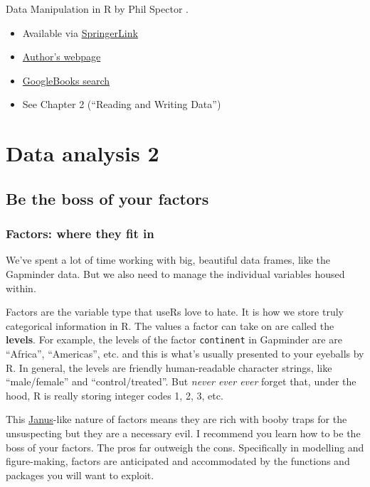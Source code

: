 \documentclass[
]{book}
\providecommand{\tightlist}{%
  \setlength{\itemsep}{0pt}\setlength{\parskip}{0pt}}
\begin{document}
Data Manipulation in R by Phil Spector \citeyearpar{spector2008}.

\begin{itemize}
\tightlist
\item
  Available via \href{https://www.springer.com/gp/book/9780387747309}{SpringerLink}
\item
  \href{https://www.stat.berkeley.edu/\%7Espector/}{Author's webpage}
\item
  \href{https://books.google.com/books?id=grfuq1twFe4C\&lpg=PP1\&dq=data\%2520manipulation\%2520spector\&pg=PP1\#v=onepage\&q\&f=false}{GoogleBooks search}
\item
  See Chapter 2 (``Reading and Writing Data'')
\end{itemize}

\hypertarget{part-data-analysis-2}{%
\part{Data analysis 2}\label{part-data-analysis-2}}

\hypertarget{factors-boss}{%
\chapter{Be the boss of your factors}\label{factors-boss}}

\hypertarget{factors-where-they-fit-in}{%
\section{Factors: where they fit in}\label{factors-where-they-fit-in}}

We've spent a lot of time working with big, beautiful data frames, like the Gapminder data. But we also need to manage the individual variables housed within.

Factors are the variable type that useRs love to hate. It is how we store truly categorical information in R. The values a factor can take on are called the \textbf{levels}. For example, the levels of the factor \texttt{continent} in Gapminder are are ``Africa'', ``Americas'', etc. and this is what's usually presented to your eyeballs by R. In general, the levels are friendly human-readable character strings, like ``male/female'' and ``control/treated''. But \emph{never ever ever} forget that, under the hood, R is really storing integer codes 1, 2, 3, etc.

This \href{https://en.wikipedia.org/wiki/Janus}{Janus}-like nature of factors means they are rich with booby traps for the unsuspecting but they are a necessary evil. I recommend you learn how to be the boss of your factors. The pros far outweigh the cons. Specifically in modelling and figure-making, factors are anticipated and accommodated by the functions and packages you will want to exploit.
\end{document}
